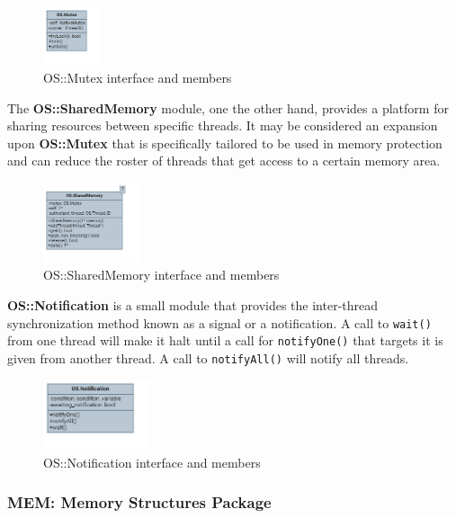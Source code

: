 \begin{figure}[H]
	\centering
	\includegraphics[width=0.15\textwidth]{./img/navig-class-mutex.png}
	\caption {OS::Mutex interface and members}
	\label{fig:navig-class-mutex}
	\end{figure}


The \textbf{OS::SharedMemory} module, one the other hand, provides a platform for sharing resources between specific threads. It may be considered an expansion upon \textbf{OS::Mutex} that is specifically tailored to be used in memory protection and can reduce the roster of threads that get access to a certain memory area. 


\begin{figure}[H]
	\centering
	\includegraphics[width=0.25\textwidth]{./img/navig-class-sharedmemory.png}
	\caption {OS::SharedMemory interface and members}
	\label{fig:navig-class-sharedmemory}
	\end{figure}


\textbf{OS::Notification} is a small module that provides the inter-thread synchronization method known as a signal or a notification. A call to \texttt{wait()} from one thread will make it halt until a call for \texttt{notifyOne()} that targets it is given from another thread. A call to \texttt{notifyAll()} will notify all threads. 


\begin{figure}[H]
	\centering
	\includegraphics[width=0.28\textwidth]{./img/navig-class-notification.png}
	\caption {OS::Notification interface and members}
	\label{fig:navig-class-notification}
	\end{figure}


\subsubsection{MEM: Memory Structures Package}

